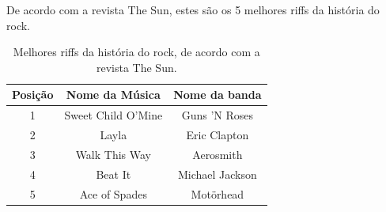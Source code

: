 De acordo com a revista The Sun, estes são os 5 melhores riffs da história do rock.

\begin{table}[!htb]
  \centering
  \caption{Melhores riffs da história do rock, de acordo com a revista The Sun.}
  \vspace{0.1cm}
\begin{tabular}{|c|c|c|}
\hline
\textbf{Posição} & \textbf{Nome da Música} & \textbf {Nome da banda} \\
\hline
1 & Sweet Child O'Mine & Guns 'N Roses  \\
\hline
2 & Layla & Eric Clapton \\
\hline
3 & Walk This Way & Aerosmith \\
\hline
4 & Beat It & Michael Jackson \\
\hline
5 & Ace of Spades & Motörhead \\
\hline
\end{tabular}

\end{table}